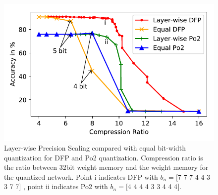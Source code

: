 \begin{figure}[t]
\includegraphics[width=\columnwidth]{img/layerwise.pdf}
\caption{Layer-wise Precision Scaling compared with equal bit-width quantization for DFP and Po2 quantization. Compression ratio is the ratio between 32bit weight memory and the weight memory for the quantized network. Point i indicates DFP with $b_n=\lbrack$7 7 7 4 4 3 3 7 7$\rbrack$ , point ii indicates Po2 with $b_n=\lbrack$4 4 4 4 3 3 4 4 4$\rbrack$.}\label{fig:lw_scale}
\end{figure}


